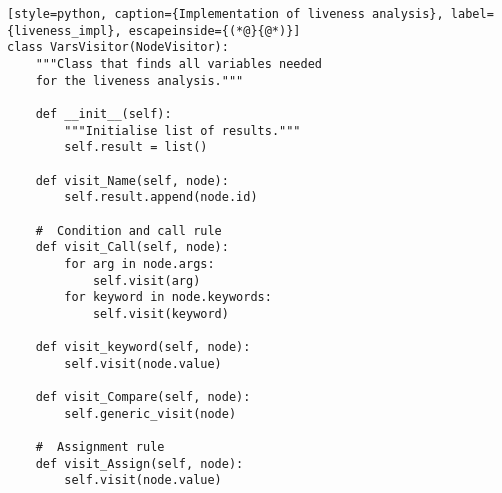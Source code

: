 \begin{lstlisting}[style=python, caption={Implementation of liveness analysis}, label={liveness_impl}, escapeinside={(*@}{@*)}]
class VarsVisitor(NodeVisitor):
    """Class that finds all variables needed
    for the liveness analysis."""

    def __init__(self):
        """Initialise list of results."""
        self.result = list()

    def visit_Name(self, node):
        self.result.append(node.id)

    #  Condition and call rule
    def visit_Call(self, node):
        for arg in node.args:
            self.visit(arg)
        for keyword in node.keywords:
            self.visit(keyword)
            
    def visit_keyword(self, node):
        self.visit(node.value)

    def visit_Compare(self, node):
        self.generic_visit(node)

    #  Assignment rule                
    def visit_Assign(self, node): 
        self.visit(node.value)          
\end{lstlisting}
